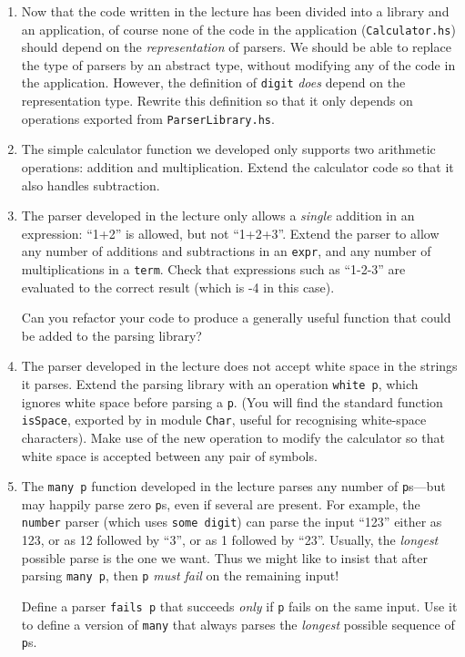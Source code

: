 \documentclass{article}
\begin{document}
\begin{enumerate}
\item
Now that the code written in the lecture has been divided into a
library and an application, of course none of the code in the
application (\verb!Calculator.hs!) should depend on the {\em
  representation} of parsers. We should be able to replace the type of
parsers by an abstract type, without modifying any of the code in the
application. However, the definition of \verb!digit! {\em does} depend
on the representation type. Rewrite this definition so that it only
depends on operations exported from \verb!ParserLibrary.hs!.

\item
The simple calculator function we developed only supports two
arithmetic operations: addition and multiplication. Extend the
calculator code so that it also handles subtraction.

\item
The parser developed in the lecture only allows a {\em single}
addition in an expression: ``1+2'' is allowed, but not
``1+2+3''. Extend the parser to allow any number of additions and
subtractions in an \verb!expr!, and any number of multiplications in a
\verb!term!. Check that expressions such as ``1-2-3'' are evaluated to
the correct result (which is -4 in this case).

Can you refactor your code to produce a generally useful function that
could be added to the parsing library?

\item
The parser developed in the lecture does not accept white space in the
strings it parses. Extend the parsing library with an operation
\verb!white p!, which ignores white space before parsing a
\verb!p!. (You will find the standard function \verb!isSpace!,
exported by in module \verb!Char!, useful for recognising white-space
characters). Make use of the new operation to modify the calculator so
that white space is accepted between any pair of symbols.

\item
The \verb!many p! function developed in the lecture parses any number
of \verb!p!s---but may happily parse zero \verb!p!s, even if several
are present. For example, the \verb!number! parser (which uses
\verb!some digit!) can parse the input ``123'' either as 123, or as 12
followed by ``3'', or as 1 followed by ``23''. Usually, the {\em
longest} possible parse is the one we want. Thus we might like to
insist that after parsing \verb!many p!, then \verb!p! {\em must fail}
on the remaining input!

Define a parser \verb!fails p! that succeeds {\em only} if \verb!p!
fails on the same input. Use it to define a version of \verb!many!
that always parses the {\em longest} possible sequence of \verb!p!s.

\end{enumerate}
\end{document}
